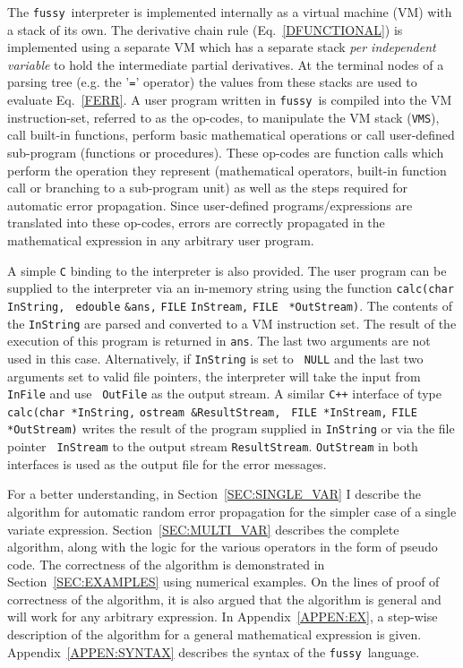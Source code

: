 \documentclass[11pt]{article}
\newcommand{\Fussy}{{\tt fussy}}
\newcommand{\VMS}{{\tt VMS}}
\begin{document}
The \Fussy\ interpreter is implemented internally as a virtual machine
(VM) with a stack of its own.  The derivative chain rule
(Eq.~\ref{DFUNCTIONAL}) is implemented using a separate VM which has a
separate stack {\it per independent variable} to hold the intermediate
partial derivatives.  At the terminal nodes of a parsing tree (e.g.
the '{\tt =}' operator) the values from these stacks are used to
evaluate Eq.~\ref{FERR}.  A user program written in \Fussy\ is
compiled into the VM instruction-set, referred to as the op-codes, to
manipulate the VM stack (\VMS), call built-in functions, perform basic
mathematical operations or call user-defined sub-program (functions or
procedures).  These op-codes are function calls which perform the
operation they represent (mathematical operators, built-in function
call or branching to a sub-program unit) as well as the steps required
for automatic error propagation.  Since user-defined
programs/expressions are translated into these op-codes, errors are
correctly propagated in the mathematical expression in any arbitrary
user program.

A simple {\tt C} binding to the interpreter is also provided.  The
user program can be supplied to the interpreter via an in-memory
string using the function {\tt calc(char} {\tt *InString,} {\tt
edouble} {\tt \&ans,} {\tt FILE} {\tt *InStream,} {\tt FILE} {\tt
*OutStream)}.  The contents of the {\tt InString} are parsed and
converted to a VM instruction set.  The result of the execution of
this program is returned in {\tt ans}.  The last two arguments are not
used in this case.  Alternatively, if {\tt InString} is set to {\tt
NULL} and the last two arguments set to valid file pointers, the
interpreter will take the input from {\tt InFile} and use {\tt
OutFile} as the output stream.  A similar {\tt C++} interface of type
{\tt calc(}{\tt char *InString,} {\tt ostream \&ResultStream,} {\tt
FILE *InStream,} {\tt FILE *OutStream)} writes the result of the
program supplied in {\tt InString} or via the file pointer {\tt
InStream} to the output stream {\tt ResultStream}.  {\tt OutStream} in
both interfaces is used as the output file for the error messages.

For a better understanding, in Section~\ref{SEC:SINGLE_VAR} I describe
the algorithm for automatic random error propagation for the simpler
case of a single variate expression.  Section~\ref{SEC:MULTI_VAR}
describes the complete algorithm, along with the logic for the various
operators in the form of pseudo code.  The correctness of the
algorithm is demonstrated in Section~\ref{SEC:EXAMPLES} using
numerical examples.  On the lines of proof of correctness of the
algorithm, it is also argued that the algorithm is general and will
work for any arbitrary expression.  In Appendix~\ref{APPEN:EX}, a
step-wise description of the algorithm for a general mathematical
expression is given.  Appendix~\ref{APPEN:SYNTAX} describes the syntax
of the \Fussy\ language.
\end{document}
